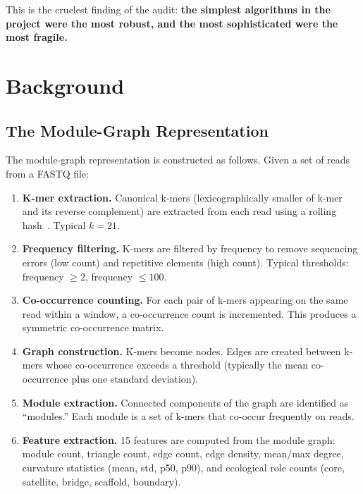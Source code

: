 \documentclass{../yalumba}
\begin{document}
This is the cruelest finding of the audit: \textbf{the simplest
algorithms in the project were the most robust, and the most
sophisticated were the most fragile.}


\section{Background}
\label{sec:background}

\subsection{The Module-Graph Representation}
\label{sec:bg-representation}

The module-graph representation is constructed as follows.  Given a set
of reads from a FASTQ file:

\begin{enumerate}
  \item \textbf{K-mer extraction.}  Canonical k-mers (lexicographically
    smaller of k-mer and its reverse complement) are extracted from each
    read using a rolling hash~\cite{karp1987rabin}.  Typical $k = 21$.
  \item \textbf{Frequency filtering.}  K-mers are filtered by frequency
    to remove sequencing errors (low count) and repetitive elements
    (high count).  Typical thresholds: frequency $\geq 2$, frequency
    $\leq 100$.
  \item \textbf{Co-occurrence counting.}  For each pair of k-mers
    appearing on the same read within a window, a co-occurrence count is
    incremented.  This produces a symmetric co-occurrence matrix.
  \item \textbf{Graph construction.}  K-mers become nodes.  Edges are
    created between k-mers whose co-occurrence exceeds a threshold
    (typically the mean co-occurrence plus one standard deviation).
  \item \textbf{Module extraction.}  Connected components of the graph
    are identified as ``modules.''  Each module is a set of k-mers that
    co-occur frequently on reads.
  \item \textbf{Feature extraction.}  15 features are computed from the
    module graph: module count, triangle count, edge count, edge density,
    mean/max degree, curvature statistics (mean, std, p50, p90), and
    ecological role counts (core, satellite, bridge, scaffold, boundary).
\end{enumerate}
\end{document}
